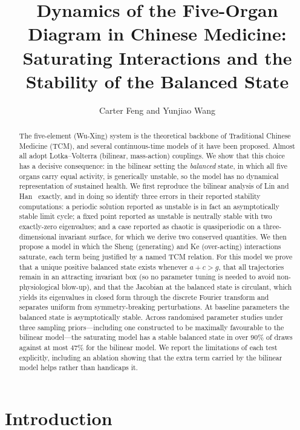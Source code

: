 \documentclass[11pt]{article}
\title{Dynamics of the Five-Organ Diagram in Chinese Medicine:\\
Saturating Interactions and the Stability of the Balanced State}
\author{Carter Feng and Yunjiao Wang}
\begin{document}
\maketitle

\begin{abstract}
The five-element (Wu-Xing) system is the theoretical backbone of Traditional
Chinese Medicine (TCM), and several continuous-time models of it have been
proposed. Almost all adopt Lotka--Volterra (bilinear, mass-action) couplings.
We show that this choice has a decisive consequence: in the bilinear setting the
\emph{balanced} state, in which all five organs carry equal activity, is
generically unstable, so the model has no dynamical representation of sustained
health. We first reproduce the bilinear analysis of Lin and Han~\cite{Lin2020}
exactly, and in doing so identify three errors in their reported stability
computations: a periodic solution reported as unstable is in fact an
asymptotically stable limit cycle; a fixed point reported as unstable is
neutrally stable with two exactly-zero eigenvalues; and a case reported as
chaotic is quasiperiodic on a three-dimensional invariant surface, for which we
derive two conserved quantities. We then propose a model in which the Sheng
(generating) and Ke (over-acting) interactions saturate, each term being
justified by a named TCM relation. For this model we prove that a unique
positive balanced state exists whenever $a+c>g$, that all trajectories remain in
an attracting invariant box (so no parameter tuning is needed to avoid
non-physiological blow-up), and that the Jacobian at the balanced state is
circulant, which yields its eigenvalues in closed form through the discrete
Fourier transform and separates uniform from symmetry-breaking perturbations. At
baseline parameters the balanced state is asymptotically stable. Across
randomised parameter studies under three sampling priors---including one
constructed to be maximally favourable to the bilinear model---the saturating
model has a stable balanced state in over 90\% of draws against at most 47\% for
the bilinear model. We report the limitations of each test explicitly, including
an ablation showing that the extra term carried by the bilinear model helps
rather than handicaps it.
\end{abstract}

\tableofcontents
\newpage

\section{Introduction}
\end{document}
